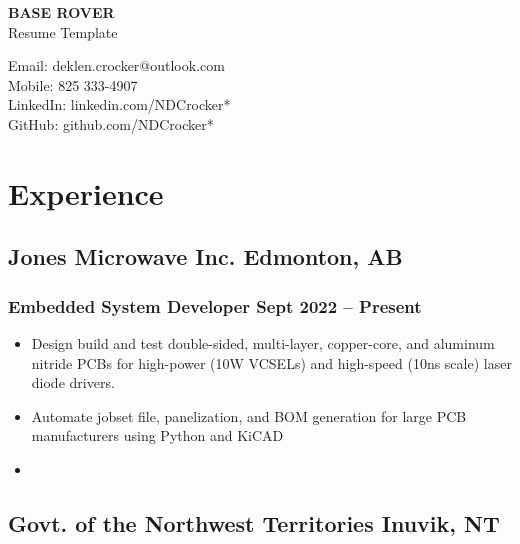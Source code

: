 \documentclass[11pt]{article} %
\begin{document}
\begin{center}
	\begin{minipage}{0.5\textwidth}
		{\Huge\bfseries
			BASE ROVER %
		} \\ \medskip
		Resume Template %
	\end{minipage} \hfill
	\begin{minipage}{0.4\textwidth}
		\raggedleft
		Email: deklen.crocker@outlook.com \\
		Mobile: 825 333-4907 \\
		LinkedIn: linkedin.com/NDCrocker* \\
		GitHub: github.com/NDCrocker* \\
	\end{minipage}
\end{center}

\section{Experience}
\subsection{Jones Microwave Inc. \hfill Edmonton, AB}
\subsubsection{Embedded System Developer \hfill  Sept 2022 – Present}
\begin{itemize}
	\item Design build and test double-sided, multi-layer, copper-core, and aluminum nitride PCBs for high-power (10W VCSELs) and high-speed (10ns scale) laser diode drivers. 
	\item Automate jobset file, panelization, and BOM generation for large PCB manufacturers using Python and KiCAD
	\item  
\end{itemize}

\subsection{Govt. of the Northwest Territories \hfill Inuvik, NT}
\end{document}
